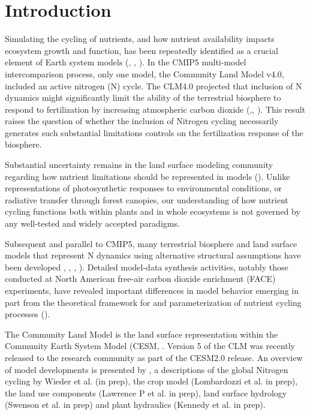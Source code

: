 \documentclass[draft,linenumbers]{agujournal}
\begin{document}
\section{Introduction}

Simulating the cycling of nutrients, and how nutrient availability impacts ecosystem growth and function, has been repeatedly identified as a crucial element of Earth system models (\cite{piao2013}, \cite{gruber2008}, \cite{wang2009}). In the CMIP5 multi-model intercomparison process, only one model, the Community Land Model v4.0, included an active nitrogen (N) cycle. The CLM4.0 projected that inclusion of N dynamics might significantly limit the ability of the terrestrial biosphere to respond to fertilization by increasing atmospheric carbon dioxide (\cite{friedlingstein2006},\cite{friedlingstein2014}, \cite{arora2013}).  This result raises the question of whether the inclusion of Nitrogen cycling necessarily generates such substantial limitations controls on the fertilization response of the biosphere. 

Substantial uncertainty remains in the land surface modeling community regarding how nutrient limitations should be represented in models (\cite{zaehledalmonech2011}). Unlike representations of photosynthetic responses to environmental conditions, or radiative transfer through forest canopies, our understanding of how nutrient cycling functions both within plants and in whole ecosystems is not governed by any well-tested and widely accepted paradigms.  

Subsequent and parallel to CMIP5, many terrestrial biosphere and land surface models that represent N dynamics using alternative structural assumptions have been developed \cite{wang2007}, \cite{zaehle2010},  \cite{goll2012}, \cite{smith2014} ). Detailed model-data synthesis activities, notably those conducted at North American free-air carbon dioxide enrichment (FACE) experiments, have revealed important differences in model behavior emerging in part from the theoretical framework for and parameterization of nutrient cycling processes (\cite{zaehle2014}).  

The Community Land Model is the land surface representation within the Community Earth System Model (CESM, \cite{hurrell2013}.  Version 5 of the CLM was recently released to the research community as part of the CESM2.0 release. An overview of model developments is presented by \cite{lawrence2018}, a descriptions of the global Nitrogen cycling by Wieder et al. (in prep), the crop model (Lombardozzi et al. in prep), the land use components (Lawrence P et al. in prep), land surface hydrology (Swenson et al. in prep) and plant hydraulics (Kennedy et al. in prep). 
\end{document}
